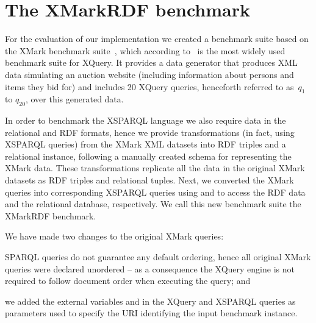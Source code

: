 \section{The XMarkRDF benchmark}
\label{sec:benchm-descr}

For the evaluation of our implementation we created a benchmark suite based on the XMark benchmark
suite~\cite{SchmidtWaasKersten:2002aa}, which according to~\citet{AfanasievMarx:2008aa} is the most widely used
benchmark suite for XQuery.  It provides a data generator that produces \ac{XML} data simulating an auction website
(including information about persons and items they bid for) and includes 20 XQuery queries, henceforth referred to
as~$q_{1}$ to $q_{20}$, over this generated data.


In order to benchmark the XSPARQL language we also require data in the relational and \ac{RDF} formats, hence we provide
transformations (in fact, using XSPARQL queries) from the XMark \ac{XML} datasets into \ac{RDF} triples and a relational
instance, following a manually created schema for representing the XMark data.
%
These transformations replicate all the data in the original XMark datasets as \ac{RDF} triples and relational tuples.
% 
Next, we converted the XMark queries into corresponding XSPARQL queries using  and 
to access the \ac{RDF} data and the relational database, respectively.
%
We call this new benchmark suite the XMarkRDF benchmark. 

We have made two changes to the original XMark queries:
\begin{inparaenum}[(1)]
\item SPARQL queries do not guarantee any default ordering, hence all original XMark queries were declared
  unordered -- as a consequence the XQuery engine is not required to follow document order when executing the query; and
\item we added the external variables  and  in the XQuery and XSPARQL queries as parameters used to
  specify the URI identifying the input benchmark instance.
\end{inparaenum}


